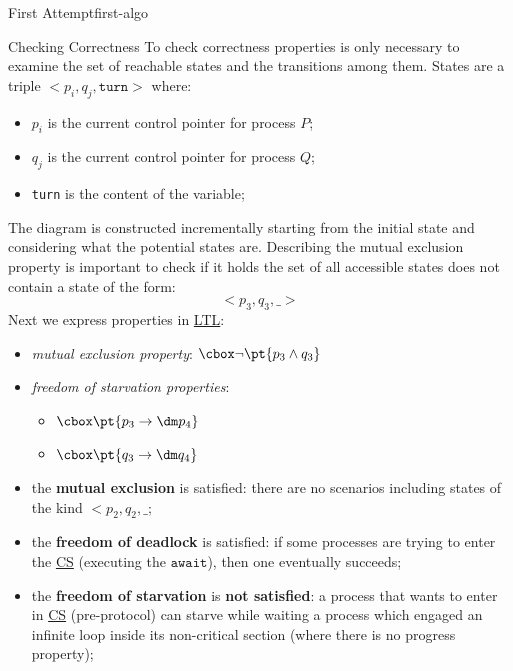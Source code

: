 \begin{remark}{First Attempt}{first-algo}
\begin{outerproof}{Checking Correctness}{}
        \emptyln{}
        To check correctness properties is only necessary to examine the set of reachable states and the transitions among them.
        States are a triple $<p_i,q_j,\texttt{turn}>$ where:
        \begin{itemize}
            \item $p_i$ is the current control pointer for process $P$;
            \item $q_j$ is the current control pointer for process $Q$;
            \item \texttt{turn} is the content of the variable;
        \end{itemize}
        The diagram is constructed incrementally starting from the initial state and considering what the potential states are.
        \emptyln{}
        Describing the mutual exclusion property is important to check if it holds the set of all accessible states does not contain a state of the form:
        \[
            <p_3,q_3,\_>
        \]
        Next we express properties in \hyperref[sub:an_ltl_temporal_operators]{LTL}:
        \begin{itemize}
            \item \textit{mutual exclusion property}: $\cbox \neg\pt{p_3 \wedge q_3}$
            \item \textit{freedom of starvation properties}:
                \begin{itemize}
                    \item $\cbox\pt{p_3\to\dm p_4}$
                    \item $\cbox\pt{q_3\to\dm q_4}$
                \end{itemize}
        \end{itemize}
    \end{outerproof}
    \begin{note}
        \begin{itemize}
            \item the \textbf{mutual exclusion} is satisfied: there are no scenarios including states of the kind $<p_2,q_2,\_$;
            \item the \textbf{freedom of deadlock} is satisfied: if some processes are trying to enter the \hyperref[def:crit-sec]{CS} (executing the $\texttt{await}$), then one eventually succeeds;
            \item the \textbf{freedom of starvation} is \textbf{not satisfied}: a process that wants to enter in \hyperref[def:crit-sec]{CS} (pre-protocol) can starve while waiting a process which engaged an infinite loop inside its non-critical section (where there is no progress property);

\end{itemize}
\end{note}
\end{remark}
